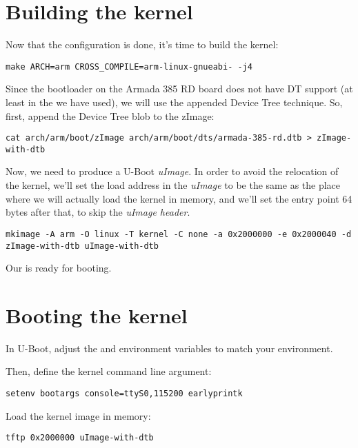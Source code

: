 \section{Building the kernel}

Now that the configuration is done, it's time to build the kernel:

\begin{verbatim}
make ARCH=arm CROSS_COMPILE=arm-linux-gnueabi- -j4
\end{verbatim}

Since the bootloader on the Armada 385 RD board does not have DT
support (at least in the 
we have used), we will use the appended Device Tree technique. So,
first, append the Device Tree blob to the zImage:

\begin{verbatim}
cat arch/arm/boot/zImage arch/arm/boot/dts/armada-385-rd.dtb > zImage-with-dtb
\end{verbatim}

Now, we need to produce a U-Boot {\em uImage}. In order to avoid the
relocation of the kernel, we'll set the load address in the {\em
  uImage} to be the same as the place where we will actually load the
kernel in memory, and we'll set the entry point 64 bytes after that,
to skip the {\em uImage header}.

\begin{verbatim}
mkimage -A arm -O linux -T kernel -C none -a 0x2000000 -e 0x2000040 -d zImage-with-dtb uImage-with-dtb
\end{verbatim}

Our  is ready for booting.

\section{Booting the kernel}

In U-Boot, adjust the  and  environment
variables to match your environment.

Then, define the kernel command line argument:

\begin{verbatim}
setenv bootargs console=ttyS0,115200 earlyprintk
\end{verbatim}

Load the kernel image in memory:

\begin{verbatim}
tftp 0x2000000 uImage-with-dtb
\end{verbatim}

